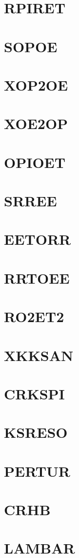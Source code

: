 \documentclass[14pt,UTF8]{ctexbook}
\begin{document}
\section{RPIRET}
\section{SOPOE}
\section{XOP2OE}
\section{XOE2OP}
\section{OPIOET}
\section{SRREE}
\section{EETORR}
\section{RRTOEE}
\section{RO2ET2}
\section{XKKSAN}
\section{CRKSPI}
\section{KSRESO}
\section{PERTUR}
\section{CRHB}
\section{LAMBAR}
\end{document}
